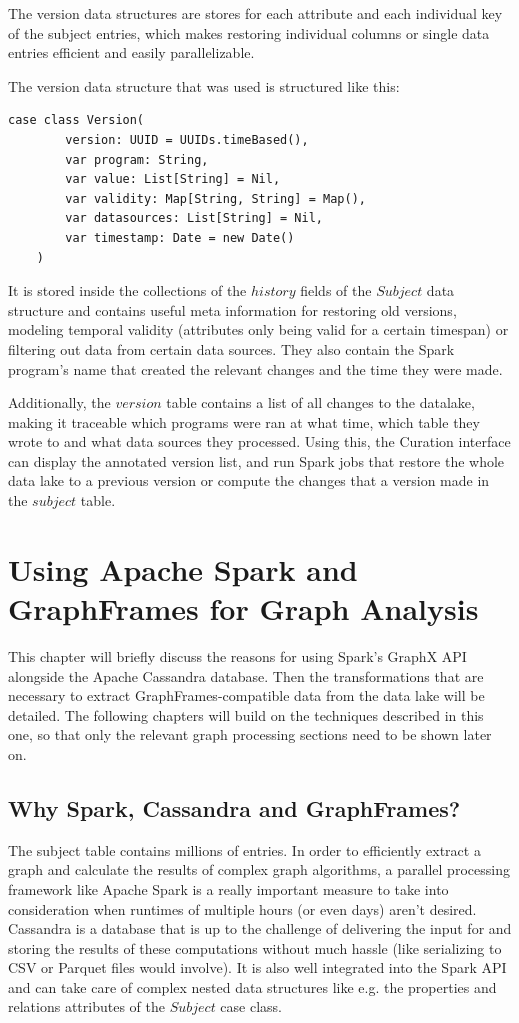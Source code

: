 \documentclass[
        a4paper,     %
        titlepage,   %
        oneside,     %
        parskip      %
        ]{scrartcl}  %
\begin{document}
    The version data structures are stores for each attribute and each individual
    key of the subject entries, which makes restoring individual columns or single
    data entries efficient and easily parallelizable.

    The version data structure that was used is structured like this:
    \begin{lstlisting}[style=scalaStyle,caption=Version]
    case class Version(
    	version: UUID = UUIDs.timeBased(),
    	var program: String,
    	var value: List[String] = Nil,
    	var validity: Map[String, String] = Map(),
    	var datasources: List[String] = Nil,
    	var timestamp: Date = new Date()
    )
    \end{lstlisting}

    It is stored inside the collections of the $history$ fields of the $Subject$
    data structure and contains useful meta information for restoring old versions,
    modeling temporal validity (attributes only being valid for a certain timespan)
    or filtering out data from certain data sources. They also contain the Spark
    program's name that created the relevant changes and the time they were made.

    Additionally, the $version$ table contains a list of all changes to the datalake,
    making it traceable which programs were ran at what time, which table they wrote
    to and what data sources they processed. Using this, the Curation interface
    can display the annotated version list, and run Spark jobs that restore the
    whole data lake to a previous version or compute the changes that a version
    made in the $subject$ table.

  \section{Using Apache Spark and GraphFrames for Graph Analysis}
  This chapter will briefly discuss the reasons for using Spark's GraphX API
  alongside the Apache Cassandra database. Then the transformations that are
  necessary to extract GraphFrames-compatible data from the data lake will be detailed.
  The following chapters will build on the techniques described in this one, so
  that only the relevant graph processing sections need to be shown later on.

    \subsection{Why Spark, Cassandra and GraphFrames?}
    The subject table contains millions of entries. In order to efficiently extract
    a graph and calculate the results of complex graph algorithms, a parallel processing
    framework like Apache Spark is a really important measure to take into consideration when runtimes
    of multiple hours (or even days) aren't desired. Cassandra is a database that
    is up to the challenge of delivering the input for and storing the results of
    these computations without much hassle (like serializing to CSV or Parquet files would involve).
    It is also well integrated into the Spark API and can take care of complex nested
    data structures like e.g. the properties and relations attributes of the $Subject$
    case class.
\end{document}
